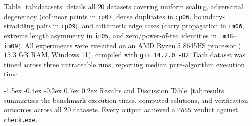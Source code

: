 \documentclass[10pt,twocolumn]{article}
\makeatletter
\renewcommand\section{\@startsection{section}{1}{\z@}%
  {-1.5ex \@plus -0.4ex \@minus -0.2ex}%
  {0.7ex \@plus 0.2ex}%
  {\normalfont\normalsize\bfseries}}
\makeatother
\begin{document}
Table~\ref{tab:datasets} details all 20 datasets covering uniform scaling, adversarial degeneracy (collinear points in \texttt{cp07}, dense duplicates in \texttt{cp06}, boundary-straddling pairs in \texttt{cp09}), and arithmetic edge cases (carry propagation in \texttt{im06}, extreme length asymmetry in \texttt{im05}, and zero/power-of-ten identities in \texttt{im08}--\texttt{im09}). All experiments were executed on an AMD Ryzen 5 8645HS processor ($15.3\text{ GB}$ RAM, Windows 11), compiled with \texttt{g++ 14.2.0 -O2}. Each dataset was timed across three untraceable runs, reporting median pure-algorithm execution time.

\section{Results and Discussion}
Table~\ref{tab:results} summarizes the benchmark execution times, computed solutions, and verification outcomes across all 20 datasets. Every output achieved a \texttt{PASS} verdict against \texttt{check.exe}.
\end{document}
